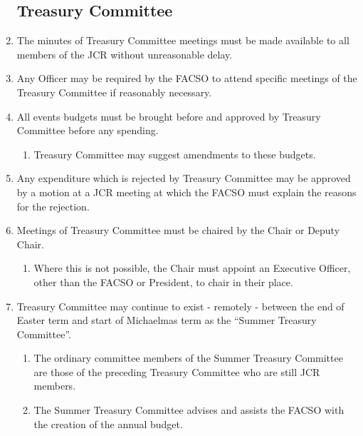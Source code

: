 \documentclass[12pt]{article}
\begin{document}
\begin{enumerate}
    \subsection{Treasury Committee}
    \item The minutes of Treasury Committee meetings must be made available to all members of the JCR without unreasonable delay.
    \item Any Officer may be required by the FACSO to attend specific meetings of the Treasury Committee if reasonably necessary.
    \item All events budgets must be brought before and approved by Treasury Committee before any spending.
    \begin{enumerate}
        \item Treasury Committee may suggest amendments to these budgets.
    \end{enumerate}
    \item Any expenditure which is rejected by Treasury Committee may be approved by a motion at a JCR meeting at which the FACSO must explain the reasons for the rejection.
    \item Meetings of Treasury Committee must be chaired by the Chair or Deputy Chair.
    \begin{enumerate}
        \item Where this is not possible, the Chair must appoint an Executive Officer, other than the FACSO or President, to chair in their place.
    \end{enumerate}
    \item Treasury Committee may continue to exist - remotely - between the end of Easter term and start of Michaelmas term as the ``Summer Treasury Committee''.
    \begin{enumerate}
        \item The ordinary committee members of the Summer Treasury Committee are those of the preceding Treasury Committee who are still JCR members.
        \item The Summer Treasury Committee advises and assists the FACSO with the creation of the annual budget.
    \end{enumerate}
\end{enumerate}
\end{document}
